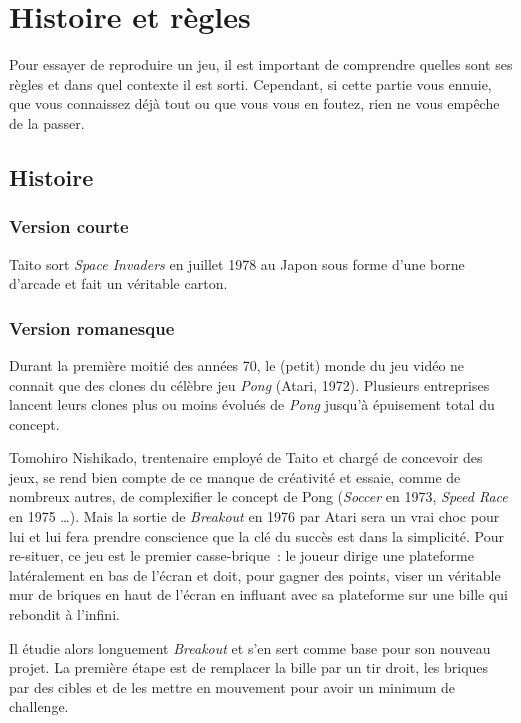 \chapter{Histoire et règles}

Pour essayer de reproduire un jeu, il est important de comprendre quelles sont
ses règles et dans quel contexte il est sorti. Cependant, si cette partie vous
ennuie, que vous connaissez déjà tout ou que vous vous en foutez, rien ne vous
empêche de la passer.

\section{Histoire}

\subsection{Version courte}

Taito sort \emph{Space Invaders} en juillet 1978 au Japon sous forme d’une borne
d’arcade et fait un véritable carton.

\subsection{Version romanesque}

Durant la première moitié des années 70, le (petit) monde du jeu vidéo ne
connait que des clones du célèbre jeu \emph{Pong} (Atari, 1972). Plusieurs
entreprises lancent leurs clones plus ou moins évolués de \emph{Pong} jusqu'à
épuisement total du concept.

Tomohiro Nishikado, trentenaire employé de Taito et chargé de
concevoir des jeux, se rend bien compte de ce manque de créativité et essaie,
comme de nombreux autres, de complexifier le concept de Pong (\emph{Soccer} en
1973, \emph{Speed Race} en 1975 \dots). Mais la sortie de \emph{Breakout} en
1976 par Atari sera un vrai choc pour lui et lui fera prendre conscience que
la clé du succès est dans la simplicité. Pour re-situer, ce jeu est le premier
casse-brique~: le joueur dirige une plateforme latéralement en bas de l'écran
et doit, pour gagner des points, viser un véritable mur de briques en haut de
l'écran en influant avec sa plateforme sur une bille qui rebondit à l'infini.

Il étudie alors longuement \emph{Breakout} et s'en sert comme base pour son
nouveau projet. La première étape est de remplacer la bille par un tir droit,
les briques par des cibles et de les mettre en mouvement pour avoir un
minimum de challenge.


